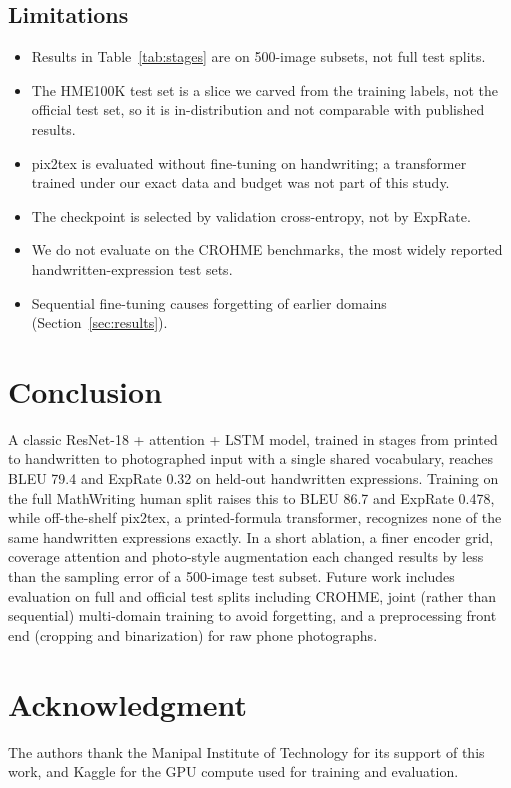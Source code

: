 \documentclass[conference]{IEEEtran}
\begin{document}
\subsection{Limitations}
\begin{itemize}
\item Results in Table~\ref{tab:stages} are on 500-image subsets, not full test splits.
\item The HME100K test set is a slice we carved from the training labels, not the official test set, so it is in-distribution and not comparable with published results.
\item pix2tex is evaluated without fine-tuning on handwriting; a transformer trained under our exact data and budget was not part of this study.
\item The checkpoint is selected by validation cross-entropy, not by ExpRate.
\item We do not evaluate on the CROHME benchmarks, the most widely reported handwritten-expression test sets.
\item Sequential fine-tuning causes forgetting of earlier domains (Section~\ref{sec:results}).
\end{itemize}

\section{Conclusion}
A classic ResNet-18 + attention + LSTM model, trained in stages from printed to handwritten to photographed input with a single shared vocabulary, reaches BLEU 79.4 and ExpRate 0.32 on held-out handwritten expressions. Training on the full MathWriting human split raises this to BLEU 86.7 and ExpRate 0.478, while off-the-shelf pix2tex, a printed-formula transformer, recognizes none of the same handwritten expressions exactly. In a short ablation, a finer encoder grid, coverage attention and photo-style augmentation each changed results by less than the sampling error of a 500-image test subset. Future work includes evaluation on full and official test splits including CROHME, joint (rather than sequential) multi-domain training to avoid forgetting, and a preprocessing front end (cropping and binarization) for raw phone photographs.

\section*{Acknowledgment}
The authors thank the Manipal Institute of Technology for its support of this work, and Kaggle for the GPU compute used for training and evaluation.
\end{document}
